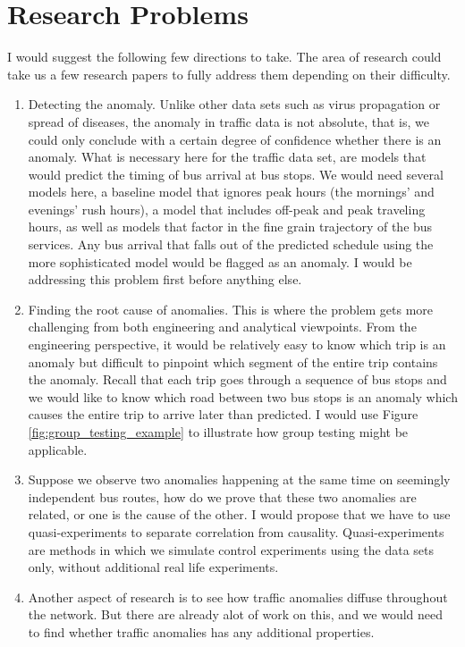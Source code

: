 \documentclass[10pt]{article}
\begin{document}
\section{Research Problems}

I would suggest the following few directions to take. The area of research could take us a few research papers to fully address them depending on their difficulty.


\begin{enumerate}
	\item Detecting the anomaly. Unlike other data sets such as virus propagation or spread of diseases, the anomaly in traffic data is not absolute, that is, we could only conclude with a certain degree of confidence whether there is an anomaly. What is necessary here for the traffic data set, are models that would predict the timing of bus arrival at bus stops. We would need several models here, a baseline model that ignores peak hours (the mornings' and evenings' rush hours), a model that includes off-peak and peak traveling hours, as well as models that factor in the fine grain trajectory of the bus services. Any bus arrival that falls out of the predicted schedule using the more sophisticated model would be flagged as an anomaly. I would be addressing this problem first before anything else.

	\item Finding the root cause of anomalies. This is where the problem gets more challenging from both engineering and analytical viewpoints. From the engineering perspective, it would be relatively easy to know which trip is an anomaly but difficult to pinpoint which segment of the entire trip contains the anomaly. Recall that each trip goes through a sequence of bus stops and we would like to know which road between two bus stops is an anomaly which causes the entire trip to arrive later than predicted. I would use Figure \ref{fig:group_testing_example} to illustrate how group testing might be applicable. %

	\item Suppose we observe two anomalies happening at the same time on seemingly independent bus routes, how do we prove that these two anomalies are related, or one is the cause of the other. I would propose that we have to use quasi-experiments to separate correlation from causality. Quasi-experiments are methods in which we simulate control experiments using the data sets only, without additional real life experiments. 


	\item Another aspect of research is to see how traffic anomalies diffuse throughout the network. But there are already alot of work on this, and we would need to find whether traffic anomalies has any additional properties.
\end{enumerate}
\end{document}
